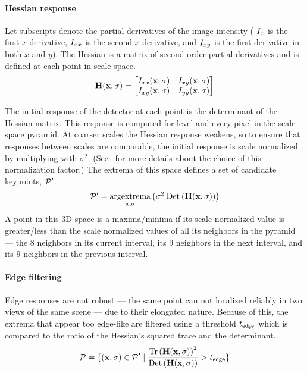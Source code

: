         \paragraph{Hessian response}
            Let subscripts denote the partial derivatives of the image intensity (\eg{} $I_{x}$ is the first $x$
            derivative, $I_{xx}$ is the second $x$ derivative, and $I_{xy}$ is the first derivative in both
            $x$ and $y$). The Hessian is a matrix of second order partial derivatives and is defined at each point
            in scale space.
            \begin{equation}
                \mathbf{H}(\mathbf{x}, \sigma) = 
                 \left[ \begin{matrix} 
                I_{xx}(\mathbf{x}, \sigma) & I_{xy}(\mathbf{x}, \sigma) \\
                I_{xy}(\mathbf{x}, \sigma) & I_{yy}(\mathbf{x}, \sigma)  \end{matrix} \right]  
            \end{equation}\label{eqn:hessianmatrix}  

            The initial response of the detector at each point is the determinant of the Hessian matrix. This
            response is computed for level and every pixel in the scale-space pyramid. At coarser scales the
            Hessian response weakens, so to ensure that responses between scales are comparable, the initial
            response is scale normalized by multiplying with $\sigma^2$. (See~\cite{lindeberg_feature_1998} for
            more details about the choice of this normalization factor.) The extrema of this space defines a set of
            candidate keypoints, $\mathcal{P}'$.
            \begin{equation}
                \mathcal{P}' = \underset{\mathbf{x},\sigma}{\operatorname{argextrema}} \left(\sigma^2 \mathbin{\textrm{Det}}\left(\mathbf{H}(\mathbf{x}, \sigma)\right)\right) 
            \end{equation}
            A point in this 3D space is a maxima/minima if its scale normalized value is greater/less than the
            scale normalized values of all its neighbors in the pyramid --- \ie{} the $8$ neighbors in its current
            interval, its $9$ neighbors in the next interval, and its $9$ neighbors in the previous interval.

        \paragraph{Edge filtering}
            Edge responses are not robust --- \ie{} the same point can not localized reliably in two views of the
            same scene --- due to their elongated nature. Because of this, the extrema that appear too edge-like
            are filtered using a threshold $t_{\tt{edge}}$ which is compared to the ratio of the Hessian's squared
            trace and the determinant.
            \begin{equation}
                \mathcal{P} = \{(\mathbf{x}, \sigma) \in \mathcal{P}' \mid
                  \frac{\mathbin{\textrm{Tr}}\left(\mathbf{H}(\mathbf{x}, \sigma)\right)^2}{\mathbin{\textrm{Det}}\left(\mathbf{H}(\mathbf{x}, \sigma)\right)} > t_{\tt{edge}}\}
            \end{equation}

